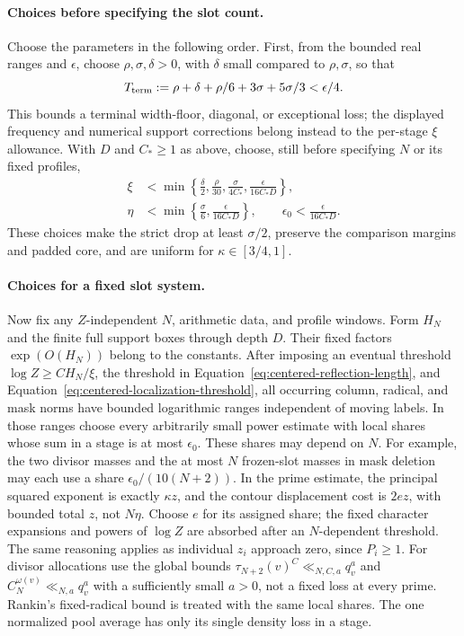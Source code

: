 \documentclass[11pt,a4paper]{article}
\numberwithin{equation}{section}
\numberwithin{figure}{section}
\theoremstyle{definition}
\theoremstyle{remark}
\begin{document}
\paragraph{Choices before specifying the slot count.}
Choose the parameters in the following order.  First, from the bounded
real ranges and \(\epsilon\), choose \(\rho,\sigma,\delta>0\), with
\(\delta\) small compared to \(\rho,\sigma\), so that
\[
 T_{\rm term}:=\rho+\delta+\rho/6+3\sigma+5\sigma/3<\epsilon/4.
\]
This bounds a terminal width-floor, diagonal, or exceptional loss;
the displayed frequency and numerical support corrections belong instead to the per-stage
\(\xi\) allowance.  With \(D\) and \(C_*\ge1\) as above, choose,
still before specifying \(N\) or its fixed profiles,
\begin{equation}
 \begin{aligned}
 \xi&<\min\left\{\frac\delta2,\frac\rho{30},
                  \frac{\sigma}{4C_*},
                  \frac{\epsilon}{16C_*D}\right\},\\
 \eta&<\min\left\{\frac\sigma6,
                   \frac{\epsilon}{16C_*D}\right\},\qquad
 \epsilon_0<\frac{\epsilon}{16C_*D}.
 \end{aligned}
 \label{old-eq:2.1i}
\end{equation}
These choices make the strict drop at least \(\sigma/2\), preserve
the comparison margins and padded core, and are uniform for
\(\kappa\in[3/4,1]\).

\paragraph{Choices for a fixed slot system.}
Now fix any \(Z\)-independent \(N\), arithmetic data, and profile
windows.  Form \(H_N\) and the finite full support boxes through
depth \(D\).  Their fixed factors \(\exp(O(H_N))\) belong to the
constants.  After imposing an eventual threshold
\(\log Z\ge C H_N/\xi\), the threshold in
Equation~\eqref{eq:centered-reflection-length}, and
Equation~\eqref{eq:centered-localization-threshold}, all occurring
column, radical, and mask norms have bounded logarithmic ranges
independent of moving labels.  In those ranges choose every
arbitrarily small power estimate with local shares whose sum in a
stage is at most \(\epsilon_0\).  These shares may depend on \(N\).
For example, the two divisor masses and the at most \(N\) frozen-slot
masses in mask deletion may each use a share
\(\epsilon_0/(10(N+2))\).  In the prime estimate, the principal
squared exponent is exactly \(\kappa z\), and the contour displacement
cost is \(2e z\), with bounded total \(z\), not \(N\eta\).  Choose
\(e\) for its assigned share; the fixed character expansions and
powers of \(\log Z\) are absorbed after an \(N\)-dependent threshold.
The same reasoning applies as individual \(z_i\) approach zero,
since \(P_i\ge1\).  For divisor allocations use the global bounds
\(\tau_{N+2}(v)^C\ll_{N,C,a}q_v^a\) and
\(C_N^{\omega(v)}\ll_{N,a}q_v^a\) with a sufficiently small
\(a>0\), not a fixed loss at every prime.  Rankin's fixed-radical
bound is treated with the same local shares.  The one normalized pool
average has only its single density loss in a stage.
\end{document}
